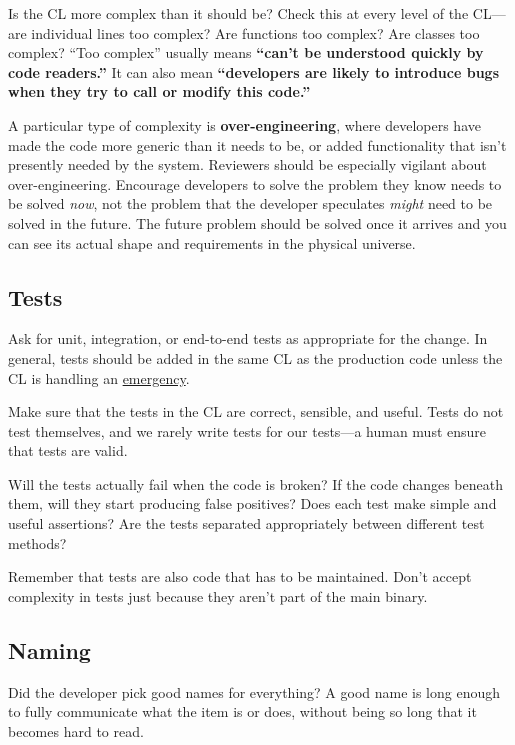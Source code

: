 \documentclass[
]{article}
\begin{document}
Is the CL more complex than it should be? Check this at every level of
the CL---are individual lines too complex? Are functions too complex?
Are classes too complex? ``Too complex'' usually means \textbf{``can't
be understood quickly by code readers.''} It can also mean
\textbf{``developers are likely to introduce bugs when they try to call
or modify this code.''}

A particular type of complexity is \textbf{over-engineering}, where
developers have made the code more generic than it needs to be, or added
functionality that isn't presently needed by the system. Reviewers
should be especially vigilant about over-engineering. Encourage
developers to solve the problem they know needs to be solved \emph{now},
not the problem that the developer speculates \emph{might} need to be
solved in the future. The future problem should be solved once it
arrives and you can see its actual shape and requirements in the
physical universe.

\subsection{Tests}\label{tests}

Ask for unit, integration, or end-to-end tests as appropriate for the
change. In general, tests should be added in the same CL as the
production code unless the CL is handling an
\href{../emergencies.md}{emergency}.

Make sure that the tests in the CL are correct, sensible, and useful.
Tests do not test themselves, and we rarely write tests for our
tests---a human must ensure that tests are valid.

Will the tests actually fail when the code is broken? If the code
changes beneath them, will they start producing false positives? Does
each test make simple and useful assertions? Are the tests separated
appropriately between different test methods?

Remember that tests are also code that has to be maintained. Don't
accept complexity in tests just because they aren't part of the main
binary.

\subsection{Naming}\label{naming}

Did the developer pick good names for everything? A good name is long
enough to fully communicate what the item is or does, without being so
long that it becomes hard to read.
\end{document}
